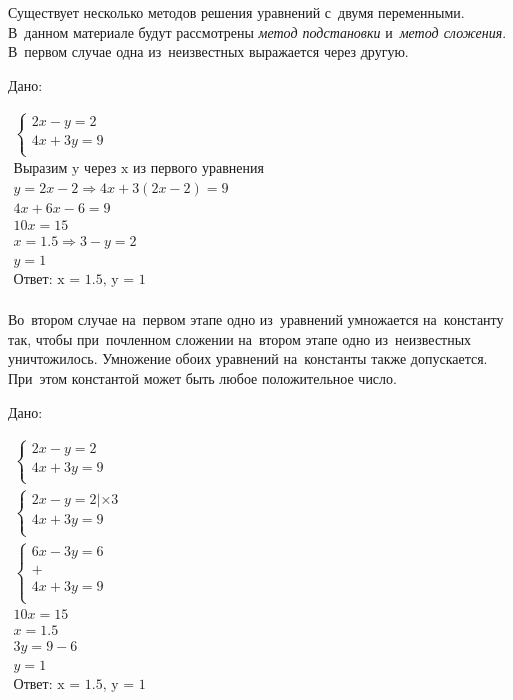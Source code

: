 \documentclass[]{scrartcl}
\begin{document}
Существует несколько методов решения уравнений с~двумя переменными. В~данном материале будут рассмотрены \emph{метод подстановки} и~\emph{метод сложения}. В~первом случае одна из~неизвестных выражается через другую.
\begin{Thexmpl}\label{ex:sys1}
	Дано:
	
	$\begin{aligned}
		\begin{cases}
			2x-y=2 \\
			4x+3y = 9\\
		\end{cases}\\
		\text{Выразим y через x из первого уравнения}\\
		y=2x-2 \Rightarrow 4x+3(2x-2) = 9 \\
		4x+6x-6 = 9 \\
		10x = 15 \\
		x = 1.5 \Rightarrow 3-y=2 \\
		y = 1 \\
		\text{Ответ: x = 1.5, y = 1} \\
		\end{aligned}$
	\end{Thexmpl}
Во~втором случае на~первом этапе одно из~уравнений умножается на~константу так, чтобы при~почленном сложении на~втором этапе одно из~неизвестных уничтожилось. Умножение обоих уравнений на~константы также допускается. При~этом константой может быть любое положительное число.
\begin{Thexmpl}\label{ex:sys2}
	Дано:
	
	$\begin{aligned}
	\begin{cases}
	2x-y=2 \\
	4x+3y=9\\
	\end{cases}\\
	\begin{cases}
	2x-y=2 | \times3 \\
	4x+3y=9\\
	\end{cases}\\
	\begin{cases}
	6x-3y=6\\
	+\\
	4x+3y=9\\
	\end{cases}\\
	10x=15\\
	x=1.5\\
	3y=9-6\\
	y=1\\
	\text{Ответ: x = 1.5, y = 1} \\
	\end{aligned}$
\end{Thexmpl}
\end{document}
